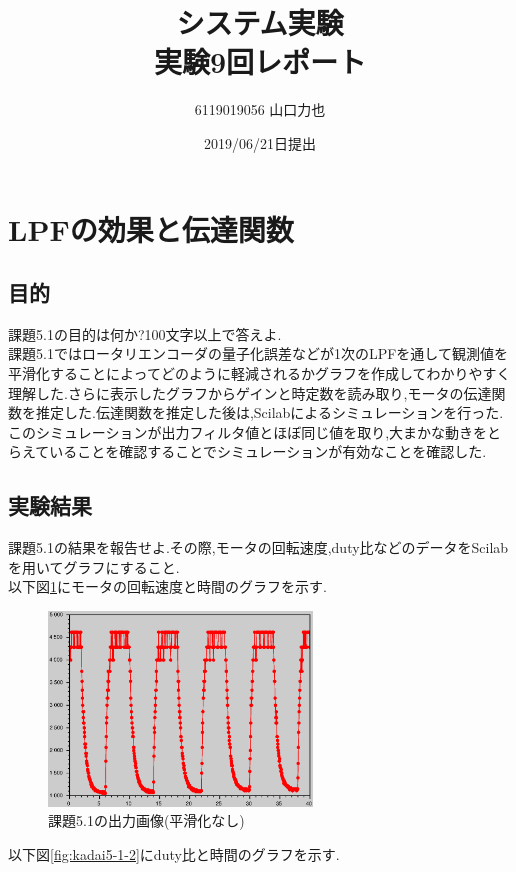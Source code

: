 \documentclass{jarticle}
\title{{システム実験}\\実験9回レポート}
\author{6119019056 山口力也}
\date{2019/06/21日提出}
\begin{document}
\maketitle
\section{LPFの効果と伝達関数}
\subsection{目的}
課題5.1の目的は何か?100文字以上で答えよ. \\

課題5.1ではロータリエンコーダの量子化誤差などが1次のLPFを通して観測値を平滑化することによってどのように軽減されるかグラフを作成してわかりやすく理解した.さらに表示したグラフからゲインと時定数を読み取り,モータの伝達関数を推定した.伝達関数を推定した後は,Scilabによるシミュレーションを行った.このシミュレーションが出力フィルタ値とほぼ同じ値を取り,大まかな動きをとらえていることを確認することでシミュレーションが有効なことを確認した.

\subsection{実験結果}
課題5.1の結果を報告せよ.その際,モータの回転速度,duty比などのデータをScilabを用いてグラフにすること. \\

以下図\ref{fig:kadai5-1-1}にモータの回転速度と時間のグラフを示す.

\begin{figure}[H]
\begin{center}
\includegraphics[width=7.0cm]{images/kadai5-1-1.eps}
\caption{課題5.1の出力画像(平滑化なし)}
\label{fig:kadai5-1-1}
\end{center}
\end{figure}

以下図\ref{fig:kadai5-1-2}にduty比と時間のグラフを示す.
\end{document}

